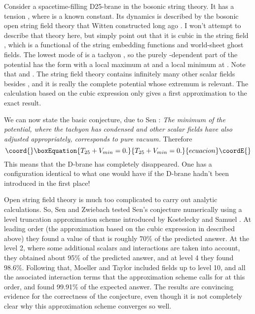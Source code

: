 \documentclass[a4paper,12pt]{article}
\begin{document}
Consider a spacetime-filling D25-brane in the \coordHE{} bosonic
string theory.  It has a tension \coordHE{}, where \coordHE{} is a
known constant.  Its dynamics is described by the bosonic open
string field theory that Witten constructed long ago \cite{W3}.  I won't
attempt to describe that theory here, but simply point out that it
is cubic in the string field \myHighlight{$\Phi$}\coordHE{}, which is a functional of the
string embedding functions \coordHE{} and world-sheet ghost
fields.  The lowest mode of \myHighlight{$\Phi$}\coordHE{} is a tachyon \coordHE{}, so the
purely \coordHE{}-dependent part of the potential has the form \coordHE{} with a local maximum at \coordHE{} and a
local minimum at \coordHE{}.  Note that \coordHE{} and \coordHE{}.  The string field theory contains infinitely many
other scalar fields besides \coordHE{}, and it is really the complete
potential whose extremum \coordHE{} is relevant.  The calculation
based on the cubic expression \coordHE{} only gives a first
approximation to the exact result.

We can now state the basic conjecture, due to Sen \cite{AS2}:  {\it The
minimum of the potential, where the tachyon has condensed and
other scalar fields have also adjusted appropriately, corresponds
to pure vacuum.} Therefore
\begin{equation}\coord{}\boxEquation{
T_{25} + V_{min} = 0.
}{
T_{25} + V_{min} = 0.
}{ecuacion}\coordE{}\end{equation}
This means that the D-brane has completely disappeared.  One has a
configuration identical to what one would have if the D-brane
hadn't been introduced in the first place!

Open string field theory is much too complicated to carry out
analytic calculations.  So, Sen and Zwiebach \cite{SZ} tested Sen's
conjecture numerically using a level truncation approximation
scheme introduced by Kostelecky and Samuel \cite{KS}.  At leading order (the
approximation based on the cubic expression in \coordHE{} described
above) they found a value of \coordHE{} that is roughly 70\% of the
predicted answer.  At the level 2, where some additional
scalars and interactions are taken into account, they obtained
about 95\% of the predicted answer, and at level 4 they found 98.6\%.  
Following that, Moeller and
Taylor \cite{MT} included fields up to level 10, and all the associated
interaction terms that the approximation scheme calls for at this
order, and found 99.91\% of the expected answer.  The results are
convincing evidence for the correctness of the conjecture, even
though it is not completely clear why this approximation scheme
converges so well.
\end{document}

